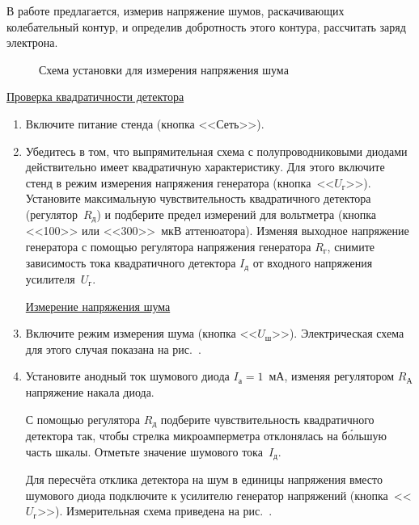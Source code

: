 \begin{lab:task}
В работе предлагается, измерив напряжение шумов, раскачивающих колебательный контур, и определив добротность этого
контура, рассчитать заряд электрона.

\begin{figure}[h!]
	\caption{Схема установки для измерения напряжения шума}
\end{figure}
		\begin{center}
			\underline{Проверка квадратичности детектора}
		\end{center}
	\begin{enumerate}
	\item Включите питание стенда (кнопка <<Сеть>>).

	\item Убедитесь в том, что выпрямительная схема с полупроводниковыми диодами действительно имеет квадратичную
характеристику. Для этого включите стенд в режим измерения напряжения генератора (кнопка~<<$U_{\text{г}}$>>). Установите
максимальную  чувствительность квадратичного детектора (регулятор~$R_{\text{д}}$) и подберите предел измерений для вольтметра
(кнопка <<100>> или <<300>>~мкВ аттенюатора). Изменяя выходное напряжение генератора с помощью регулятора напряжения
генератора $R_{\text{г}}$, снимите зависимость тока квадратичного детектора $I_{\text{д}}$ от входного напряжения усилителя~$U_{\text{г}}$.
		\begin{center}
			\underline{Измерение напряжения шума}
 		\end{center}
	\item Включите режим измерения шума (кнопка <<$U_{\text{ш}}$>>). Электрическая схема для этого случая показана на рис.~.

	\item Установите анодный ток шумового диода $I_{\text{а}}=1$~мА, изменяя регулятором $R_{\text{А}}$ напряжение накала диода.

С помощью регулятора $R_{\text{д}}$ подберите чувствительность квадратичного детектора так, чтобы стрелка микроамперметра
отклонялась на б\'ольшую часть шкалы. Отметьте значение шумового тока~$I_{\text{д}}$.

Для пересчёта отклика детектора на шум в единицы напряжения вместо шумового диода подключите к усилителю генератор
напряжений (кнопка~<<$U_{\text{г}}$>>). Измерительная схема приведена на рис.~.


\end{enumerate}
\end{lab:task}
